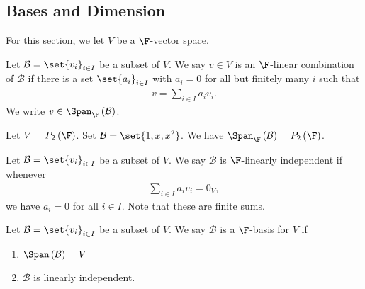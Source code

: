 \documentclass[10pt]{mypackage}
\begin{document}
\subsection{Bases and Dimension}%
For this section, we let $V $ be a $ \F$-vector space.
\begin{definition}
  Let $\mathcal{B} = \set{v_i}_{i\in I}$ be a subset of $V$. We say $v\in V$ is an $\F$-linear combination of $\mathcal{B}$ if there is a set $\set{a_i}_{i\in I}$ with $a_i = 0$ for all but finitely many $i$ such that
  \begin{align*}
    v = \sum_{i\in I}a_iv_i.
  \end{align*}
  We write $v\in \Span_{\F}\left(\mathcal{B}\right)$.
\end{definition}
\begin{example}
  Let $V = P_2\left(\F\right)$. Set $\mathcal{B} = \set{1,x,x^2}$. We have $\Span_{\F}\left(\mathcal{B}\right) = P_2\left(\F\right)$.
\end{example}
\begin{definition}
  Let $\mathcal{B} = \set{v_i}_{i\in I}$ be a subset of $V$. We say $\mathcal{B}$ is $\F$-linearly independent if whenever
  \begin{align*}
    \sum_{i\in I}a_iv_i = 0_V,
  \end{align*}
  we have $a_i = 0 $ for all $i\in I$. Note that these are finite sums.
\end{definition}
\begin{definition}
  Let $\mathcal{B} = \set{v_i}_{i\in I}$ be a subset of $V$. We say $\mathcal{B}$ is a $\F$-basis for $V$ if
  \begin{enumerate}[(1)]
    \item $\Span\left(\mathcal{B}\right) = V$
    \item $\mathcal{B}$ is linearly independent.
  \end{enumerate}
\end{definition}
\end{document}
